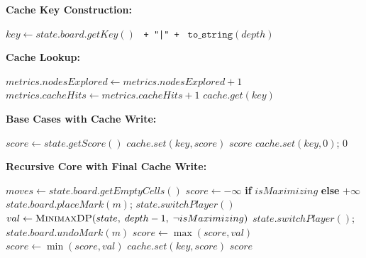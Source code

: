 \documentclass[conference]{IEEEtran}
\begin{document}
\textbf{Cache Key Construction:}

\begin{algorithm}[htbp]
\caption{Cache Key Construction}
\begin{algorithmic}[1]
\State $key \gets state.board.getKey()$
    \texttt{ + "|" + } $\texttt{to\_string}(depth)$
\State {}
\State {}
\end{algorithmic}
\end{algorithm}

\textbf{Cache Lookup:}

\begin{algorithm}[htbp]
\caption{Cache Lookup}
\begin{algorithmic}[1]
\State $metrics.nodesExplored \gets metrics.nodesExplored + 1$
    \State $metrics.cacheHits \gets metrics.cacheHits + 1$
    \State \Return $cache.get(key)$
\EndIf
\end{algorithmic}
\end{algorithm}

\textbf{Base Cases with Cache Write:}

\begin{algorithm}[htbp]
\caption{Base Cases with Cache Write}
\begin{algorithmic}[1]
    \State $score \gets state.getScore()$
    \State $cache.set(key, score)$
    \State \Return $score$
\EndIf
{}
    \State $cache.set(key, 0)$; \quad \Return $0$
\EndIf
\end{algorithmic}
\end{algorithm}

\textbf{Recursive Core with Final Cache Write:}

\begin{algorithm}[htbp]
\caption{Recursive Core with Cache Write}
\begin{algorithmic}[1]
\State $moves \gets state.board.getEmptyCells()$
\State $score \gets -\infty$ \textbf{ if } $isMaximizing$ \textbf{ else } $+\infty$
    \State $state.board.placeMark(m)$; \quad $state.switchPlayer()$
    \State $val \gets \Call{MinimaxDP}{state,\; depth-1,\; \neg isMaximizing}$
    \State $state.switchPlayer()$; \quad $state.board.undoMark(m)$
        \State $score \gets \max(score, val)$
    \Else
        \State $score \gets \min(score, val)$
    \EndIf
\EndFor
\State $cache.set(key, score)$
\State \Return $score$
\end{algorithmic}
\end{algorithm}
\end{document}
